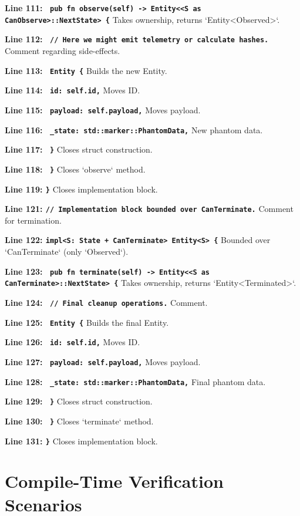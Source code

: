 \textbf{Line 111: \texttt{    pub fn observe(self) -> Entity<<S as CanObserve>::NextState> \{}}
Takes ownership, returns `Entity<Observed>`.

\textbf{Line 112: \texttt{        // Here we might emit telemetry or calculate hashes.}}
Comment regarding side-effects.

\textbf{Line 113: \texttt{        Entity \{}}
Builds the new Entity.

\textbf{Line 114: \texttt{            id: self.id,}}
Moves ID.

\textbf{Line 115: \texttt{            payload: self.payload,}}
Moves payload.

\textbf{Line 116: \texttt{            \_state: std::marker::PhantomData,}}
New phantom data.

\textbf{Line 117: \texttt{        \}}}
Closes struct construction.

\textbf{Line 118: \texttt{    \}}}
Closes `observe` method.

\textbf{Line 119: \texttt{\}}}
Closes implementation block.

\textbf{Line 121: \texttt{// Implementation block bounded over CanTerminate.}}
Comment for termination.

\textbf{Line 122: \texttt{impl<S: State + CanTerminate> Entity<S> \{}}
Bounded over `CanTerminate` (only `Observed`).

\textbf{Line 123: \texttt{    pub fn terminate(self) -> Entity<<S as CanTerminate>::NextState> \{}}
Takes ownership, returns `Entity<Terminated>`.

\textbf{Line 124: \texttt{        // Final cleanup operations.}}
Comment.

\textbf{Line 125: \texttt{        Entity \{}}
Builds the final Entity.

\textbf{Line 126: \texttt{            id: self.id,}}
Moves ID.

\textbf{Line 127: \texttt{            payload: self.payload,}}
Moves payload.

\textbf{Line 128: \texttt{            \_state: std::marker::PhantomData,}}
Final phantom data.

\textbf{Line 129: \texttt{        \}}}
Closes struct construction.

\textbf{Line 130: \texttt{    \}}}
Closes `terminate` method.

\textbf{Line 131: \texttt{\}}}
Closes implementation block.

\section{Compile-Time Verification Scenarios}

